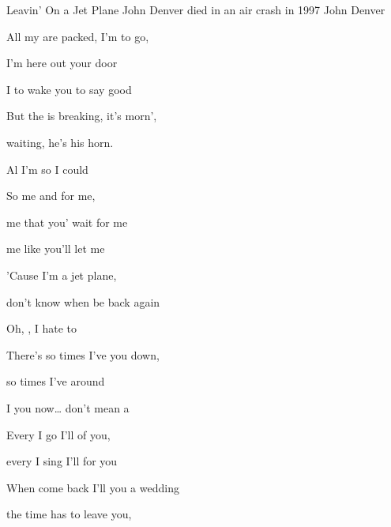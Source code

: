 \begin{SBSong}{Leavin' On a Jet Plane}
  {John Denver died in an air crash in 1997}
  {John Denver}
  \begin{SBVerse}
    All my  are packed, I'm  to go,

    I'm  here out your door
    
    I  to wake you  to say good  
    
    But the  is breaking, it's  morn', 
    
     waiting, he's  his horn.
    
    Al I'm so  I could   
  \end{SBVerse}
  \begin{SBChorus}
    So  me and  for me, 
    
     me that you' wait for me
    
     me like you'll  let me   
    
    'Cause I'm   a jet plane, 
    
    don't know when  be back again 
    
    Oh, , I hate to   
  \end{SBChorus}
  \begin{SBVerse}
    There's so  times I've  you down, 
    
    so  times I've  around
    
    I  you now\ldots {} don't mean a   
    
    Every  I go I'll  of you, 
    
    every  I sing I'll  for you
    
    When  come back I'll  you a wedding   
  \end{SBVerse}
  \begin{SBVerse}
     the time has  to leave you, 
    

\end{SBVerse}
\end{SBSong}
